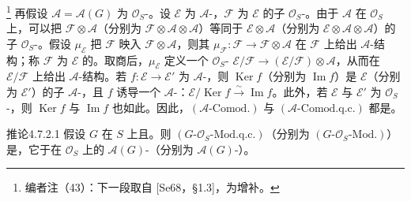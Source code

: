 \footnote{编者注（43）：下一段取自 [Se68，§1.3]，为增补。} 再假设 $\mathcal A=\mathcal A(G)$ 为 $\mathcal O_S$-。设 $\mathcal E$ 为 $\mathcal A$-，$\mathcal F$ 为 $\mathcal E$ 的子 $\mathcal O_S$-。由于 $\mathcal A$ 在 $\mathcal O_S$ 上，可以把 $\mathcal F\otimes\mathcal A$（分别为 $\mathcal F\otimes\mathcal A\otimes\mathcal A$）等同于 $\mathcal E\otimes\mathcal A$（分别为 $\mathcal E\otimes\mathcal A\otimes\mathcal A$）的子 $\mathcal O_S$-。假设 $\mu_{\mathcal E}$ 把 $\mathcal F$ 映入 $\mathcal F\otimes\mathcal A$，则其 $\mu_{\mathcal F}:\mathcal F\to\mathcal F\otimes\mathcal A$ 在 $\mathcal F$ 上给出 $\mathcal A$-结构；称 $\mathcal F$ 为 $\mathcal E$ 的。取商后，$\mu_{\mathcal E}$ 定义一个 $\mathcal O_S$- $\mathcal E/\mathcal F\to(\mathcal E/\mathcal F)\otimes\mathcal A$，从而在 $\mathcal E/\mathcal F$ 上给出 $\mathcal A$-结构。若 $f:\mathcal E\to\mathcal E'$ 为 $\mathcal A$-，则 $\operatorname{Ker}f$（分别为 $\operatorname{Im}f$）是 $\mathcal E$（分别为 $\mathcal E'$）的子 $\mathcal A$-，且 $f$ 诱导一个 $\mathcal A$-：$\mathcal E/\operatorname{Ker}f\xrightarrow\sim\operatorname{Im}f$。此外，若 $\mathcal E$ 与 $\mathcal E'$ 为 $\mathcal O_S$-，则 $\operatorname{Ker}f$ 与 $\operatorname{Im}f$ 也如此。因此，$(\mathcal A\text{-}\mathrm{Comod.})$ 与 $(\mathcal A\text{-}\mathrm{Comod.q.c.})$ 都是。
\begin{SGAresult}{推论}{4.7.2.1}
假设 $G$ 在 $S$ 上且。则 $(G\text{-}\mathcal O_S\text{-}\mathrm{Mod.q.c.})$（分别为 $(G\text{-}\mathcal O_S\text{-}\mathrm{Mod.})$）是，它于在 $\mathcal O_S$ 上的 $\mathcal A(G)$-（分别为 $\mathcal A(G)$-）。
\end{SGAresult}


